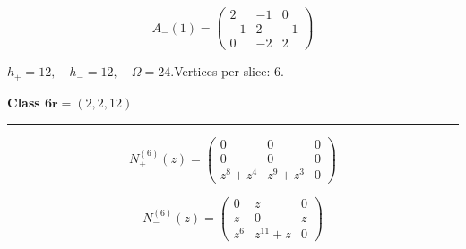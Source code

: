 \begin{minipage}{\linewidth}
\begin{minipage}[c]{0.495\linewidth}
\setlength{\abovedisplayskip}{3pt}\setlength{\belowdisplayskip}{3pt}
\setlength{\abovedisplayshortskip}{3pt}\setlength{\belowdisplayshortskip}{3pt}
\setlength{\arraycolsep}{3.5pt}\renewcommand{\arraystretch}{1.18}
\[A_{-}(1)=\begin{pmatrix}2 & -1 & 0\\-1 & 2 & -1\\0 & -2 & 2\end{pmatrix}\]
\end{minipage}%
\par\smallskip\noindent\small $h_+=12,\quad h_-=12,\quad \Omega=24.$\quad Vertices per slice: 6.
\end{minipage}\par\vfill
\noindent\begin{minipage}{\linewidth}
\noindent\textbf{Class 6}\hfill $\symbf{r}=(2,2,12)$
\par\smallskip\noindent\textcolor{rulegray}{\rule{\linewidth}{0.3pt}}
\begin{minipage}[c]{0.495\linewidth}\centering\fontsize{10.5}{13}\selectfont
\setlength{\abovedisplayskip}{3pt}\setlength{\belowdisplayskip}{3pt}
\setlength{\abovedisplayshortskip}{3pt}\setlength{\belowdisplayshortskip}{3pt}
\setlength{\arraycolsep}{3.5pt}\renewcommand{\arraystretch}{1.18}
\[N_{+}^{(6)}(z)=\begin{pmatrix}0 & 0 & 0\\0 & 0 & 0\\z^{8} + z^{4} & z^{9} + z^{3} & 0\end{pmatrix}\]
\end{minipage}%
\begin{minipage}[c]{0.495\linewidth}\centering\fontsize{10.5}{13}\selectfont
\setlength{\abovedisplayskip}{3pt}\setlength{\belowdisplayskip}{3pt}
\setlength{\abovedisplayshortskip}{3pt}\setlength{\belowdisplayshortskip}{3pt}
\setlength{\arraycolsep}{3.5pt}\renewcommand{\arraystretch}{1.18}
\[N_{-}^{(6)}(z)=\begin{pmatrix}0 & z & 0\\z & 0 & z\\z^{6} & z^{11} + z & 0\end{pmatrix}\]
\end{minipage}%
\par\noindent
\begin{minipage}[c]{0.495\linewidth}\centering\fontsize{10.5}{13}\selectfont
\setlength{\abovedisplayskip}{3pt}\setlength{\belowdisplayskip}{3pt}
\setlength{\abovedisplayshortskip}{3pt}\setlength{\belowdisplayshortskip}{3pt}
\setlength{\arraycolsep}{3.5pt}\renewcommand{\arraystretch}{1.18}

\end{minipage}
\end{minipage}
